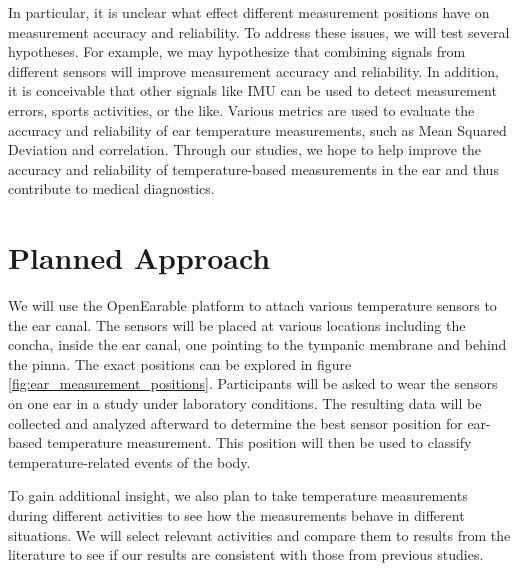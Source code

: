 In particular, it is unclear what effect different measurement positions have on measurement accuracy and reliability.
To address these issues, we will test several hypotheses. 
For example, we may hypothesize that combining signals from different sensors will improve measurement accuracy and reliability.
In addition, it is conceivable that other signals like IMU can be used to detect measurement errors, sports activities, or the like.
Various metrics are used to evaluate the accuracy and reliability of ear temperature measurements, such as Mean Squared Deviation and correlation.
Through our studies, we hope to help improve the accuracy and reliability of temperature-based measurements in the ear and thus contribute to medical diagnostics.

\section{Planned Approach}
\label{ch:Introduction:PlannedApproach}
We will use the OpenEarable platform to attach various temperature sensors to the ear canal. 
The sensors will be placed at various locations including the concha, inside the ear canal, one pointing to the tympanic membrane and behind the pinna.
The exact positions can be explored in figure \ref{fig:ear_measurement_positions}.
Participants will be asked to wear the sensors on one ear in a study under laboratory conditions.
The resulting data will be collected and analyzed afterward to determine the best sensor position for ear-based temperature measurement. 
This position will then be used to classify temperature-related events of the body.

To gain additional insight, we also plan to take temperature measurements during different activities to see how the measurements behave in different situations. We will select relevant activities and compare them to results from the literature to see if our results are consistent with those from previous studies.

